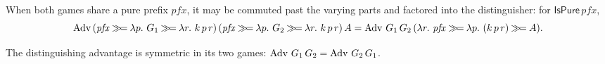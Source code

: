 \begin{theorem}
  \label{thm:advantage-factorization-comm}
  \leanok
  When both games share a pure prefix $\mathit{pfx}$, it may be commuted past the
  varying parts and factored into the distinguisher: for $\mathsf{IsPure}\,\mathit{pfx}$,
  \[
    \AdvantageA\,(\mathit{pfx} \bind \lambda p.\ G_1 \bind \lambda r.\ k\,p\,r)\,
                 (\mathit{pfx} \bind \lambda p.\ G_2 \bind \lambda r.\ k\,p\,r)\,A
    = \AdvantageA\,G_1\,G_2\,(\lambda r.\ \mathit{pfx} \bind \lambda p.\ (k\,p\,r) \bind A).
  \]
\end{theorem}

\begin{theorem}
  \label{thm:advantage-symm}
  \leanok
  The distinguishing advantage is symmetric in its two games:
  $\operatorname{Adv}\,G_1\,G_2 = \operatorname{Adv}\,G_2\,G_1$.
\end{theorem}
